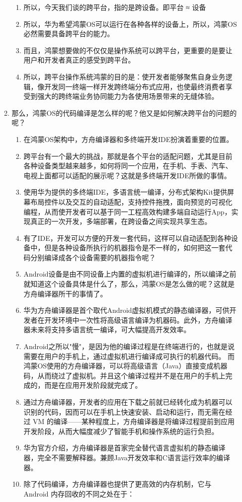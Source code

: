 \documentclass{article}
\begin{document}
\begin{enumerate}
\begin{enumerate}
\begin{enumerate}
    \item 所以，今天我们谈的跨平台，指的是跨设备。即平台 ≈ 设备
    \item 所以，华为希望鸿蒙OS可以运行在各种各样的设备上，所以，鸿蒙OS必然需要具备跨平台的能力。
    \item 而且，鸿蒙想要做的不仅仅是操作系统可以跨平台，更重要的是要让用户和开发者真正的感受到跨平台。
    \item 所以，跨平台操作系统鸿蒙的目的是：使开发者能够聚焦自身业务逻辑，像开发同一终端一样开发跨终端分布式应用，也使最终消费者享受到强大的跨终端业务协同能力为各使用场景带来的无缝体验。
\end{enumerate}
    \item 那么，鸿蒙OS的代码编译是怎么样的呢？他又是如何解决跨平台的问题的呢？
\begin{enumerate}
    \item 在鸿蒙OS架构中，方舟编译器和多终端开发IDE扮演着重要的位置。
    \item 跨平台有一个最大的挑战，那就是各个平台的适配问题，尤其是目前各种设备类型越来越多，如何将同一个应用，在手机、手表、汽车、电视上面都可以适配的展示呢？这就是多终端开发IDE所做的事情。
    \item 使用华为提供的多终端IDE，多语言统一编译，分布式架构Kit提供屏幕布局控件以及交互的自动适配，支持控件拖拽，面向预览的可视化编程，从而使开发者可以基于同一工程高效构建多端自动运行App，实现真正的一次开发，多端部署，在跨设备之间实现共享生态。
    \item 有了IDE，开发可以方便的开发一套代码，这样可以自动适配到各种设备中，但是各种设备所执行的机器指令是不一样的，如何把这一套代码分别编译成各个设备需要的机器指令呢？
    \item Android设备是由不同设备上内置的虚拟机进行编译的，所以编译之前就知道这个设备具体是什么了，那么，鸿蒙OS是怎么做的呢？这就是方舟编译器所干的事情了。
    \item 华为方舟编译器是首个取代Android虚拟机模式的静态编译器，可供开发者在开发环境中一次性将高级语言编译为机器码。此外，方舟编译器未来将支持多语言统一编译，可大幅提高开发效率。
    \item Android之所以"慢"，是因为他的编译过程是在终端进行的，也就是说需要在用户的手机上，通过虚拟机进行编译成可执行的机器代码。
而鸿蒙OS使用的方舟编译器，可以将高级语言（Java）直接变成机器码，从而绕过了虚拟机。并且这个编译过程并不是在用户的手机上完成的，而是在应用开发阶段就完成了。
    \item 通过方舟编译器，开发者的应用在下载之前就已经转化成为机器可以识别的代码，因而可以在手机上快速安装、启动和运行，而无需在经过 VM 的编译——某种程度上，方舟编译器是将编译过程提前到应用开发阶段，从而大幅度减少了智能手机和操作系统的运行负担。
    \item 华为官方介绍，方舟编译器是首家完全替代语言虚拟机的静态编译器，完全不需要解释器。兼顾Java开发效率和C语言运行效率的编译器。
    \item 除了代码编译，方舟编译器也提供了更高效的内存机制，它与 Android 内存回收的不同之处在于：


\end{enumerate}
\end{enumerate}
\end{enumerate}
\end{document}
